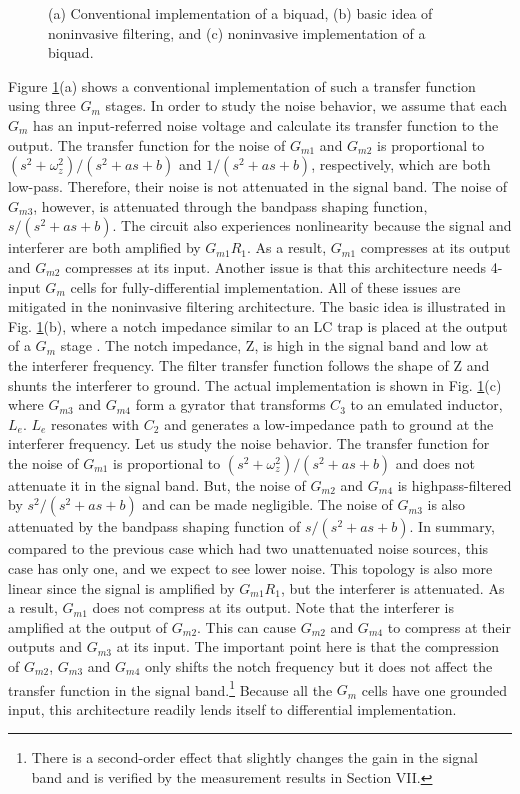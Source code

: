 \begin{figure}[htb]
\vspace{3.6in}
\caption{(a) Conventional implementation of a biquad, (b) basic idea of noninvasive filtering, and (c) noninvasive implementation of a biquad.}
\label{biquad}
\end{figure}
Figure \ref{biquad}(a) shows a conventional implementation of such a transfer function using three $G_m$ stages.  
In order to study the noise behavior, we assume that each $G_m$ has an input-referred noise voltage and calculate its transfer function to the output.
The transfer function for the noise of $G_{m1}$ and $G_{m2}$ is proportional to $(s^2+\omega_z^2)/(s^2+as+b)$ and $1/(s^2+as+b)$, respectively, which
are both low-pass. Therefore, their noise is not attenuated in the signal band.
The noise of $G_{m3}$, however, is attenuated through the bandpass shaping function, $s/(s^2+as+b)$. 
The circuit also experiences nonlinearity because the signal and interferer are both amplified by $G_{m1}R_1$. As a result, $G_{m1}$ compresses at its
output and $G_{m2}$ compresses at its input. Another issue is that this architecture needs 4-input $G_m$ cells for fully-differential implementation.
All of these issues are mitigated in the noninvasive filtering architecture. 
The basic idea is illustrated in Fig. \ref{biquad}(b), where a notch impedance similar to an LC trap is placed at the output of a $G_m$ stage
\cite{Zolfaghari}. The notch impedance, Z, is high in the signal band and low at the interferer frequency. The filter transfer function follows the
shape of Z and shunts the interferer to ground. 
The actual implementation is shown in Fig. \ref{biquad}(c) where $G_{m3}$ and $G_{m4}$ form a gyrator that transforms $C_3$ to an emulated inductor,
$L_e$. $L_e$ resonates with $C_2$ and generates a low-impedance path to ground at the interferer frequency. 
Let us study the noise behavior. The transfer function for the noise of $G_{m1}$ is proportional to $(s^2+\omega_z^2)/(s^2+as+b)$ and does not
attenuate it in the signal band. But, the noise of $G_{m2}$ and $G_{m4}$ is highpass-filtered by $s^2/(s^2+as+b)$ and can be made negligible. The
noise of $G_{m3}$ is also attenuated by the bandpass shaping function of $s/(s^2+as+b)$. 
In summary, compared to the previous case which had two unattenuated noise sources, this case has only one, and we expect to see lower noise.  
This topology is also more linear since the signal is amplified by $G_{m1}R_1$, but the interferer is attenuated. As a result, $G_{m1}$ does not
compress at its output. Note that the interferer is amplified at the output of $G_{m2}$. This can cause $G_{m2}$ and $G_{m4}$ to compress at their
outputs and $G_{m3}$ at its input. The important point here is that the compression of $G_{m2}$, $G_{m3}$ and $G_{m4}$ only shifts the notch frequency
but it does not affect the transfer function in the signal band.\footnote{There is a second-order effect that slightly changes the gain in the signal
band and is verified by the measurement results in Section VII.} Because all the $G_m$ cells have one grounded input, this architecture readily lends
itself to differential implementation.




